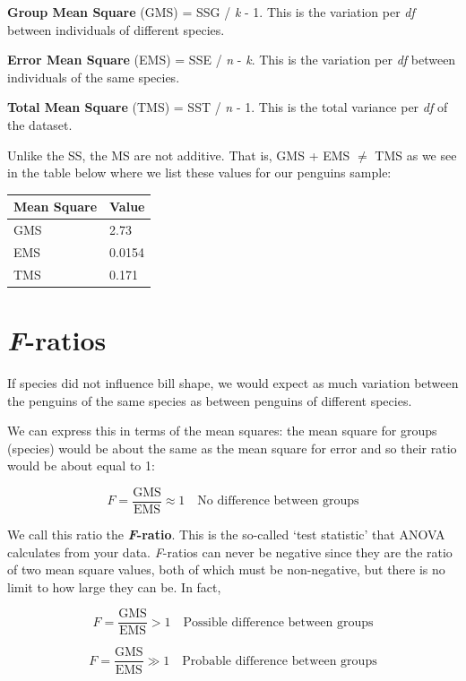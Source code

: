 \documentclass[
  letterpaper,
  DIV=11,
  numbers=noendperiod]{scrreprt}
\begin{document}
\textbf{Group Mean Square} (GMS) = SSG / \emph{k} - 1. This is the
variation per \emph{df} between individuals of different species.

\textbf{Error Mean Square} (EMS) = SSE / \emph{n} - \emph{k}. This is
the variation per \emph{df} between individuals of the same species.

\textbf{Total Mean Square} (TMS) = SST / \emph{n} - 1. This is the total
variance per \emph{df} of the dataset.

Unlike the SS, the MS are not additive. That is, GMS + EMS \(\neq\) TMS
as we see in the table below where we list these values for our penguins
sample:

\begin{longtable}[]{@{}ll@{}}
\toprule\noalign{}
Mean Square & Value \\
\midrule\noalign{}
\endhead
\bottomrule\noalign{}
\endlastfoot
GMS & 2.73 \\
EMS & 0.0154 \\
TMS & 0.171 \\
\end{longtable}

\section{\texorpdfstring{\emph{F}-ratios}{F-ratios}}\label{f-ratios}

If species did not influence bill shape, we would expect as much
variation between the penguins of the same species as between penguins
of different species.

We can express this in terms of the mean squares: the mean square for
groups (species) would be about the same as the mean square for error
and so their ratio would be about equal to 1:

\[
F=\frac{\text{GMS}}{\text{EMS}}\approx1\quad{\text{No difference between groups}}
\]

We call this ratio the \textbf{\emph{F}-ratio}. This is the so-called
`test statistic' that ANOVA calculates from your data. \emph{F}-ratios
can never be negative since they are the ratio of two mean square
values, both of which must be non-negative, but there is no limit to how
large they can be. In fact,

\[
F = \frac{\text{GMS}}{\text{EMS}}\gt 1\quad{\text{Possible difference between groups}}
\]

\[
F = \frac{\text{GMS}}{\text{EMS}}\gg 1\quad{\text{Probable difference between groups}}
\]
\end{document}
